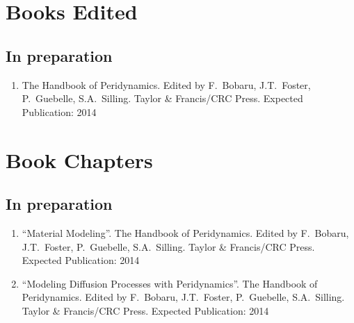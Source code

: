 \section*{Books Edited}


\subsection*{In preparation}

\begin{enumerate}
	\item The Handbook of Peridynamics. Edited by F.~Bobaru, J.T.~Foster, P.~Guebelle, S.A.~Silling. Taylor \& Francis/CRC Press. Expected Publication: 2014 
\end{enumerate}

\section*{Book Chapters}


\subsection*{In preparation}

\begin{enumerate}
	\item ``Material Modeling''.  The Handbook of Peridynamics. Edited by F.~Bobaru, J.T.~Foster, P.~Guebelle, S.A.~Silling. Taylor \& Francis/CRC Press. Expected Publication: 2014 
	\item ``Modeling Diffusion Processes with Peridynamics''.  The Handbook of Peridynamics. Edited by F.~Bobaru, J.T.~Foster, P.~Guebelle, S.A.~Silling. Taylor \& Francis/CRC Press. Expected Publication: 2014 
\end{enumerate}


